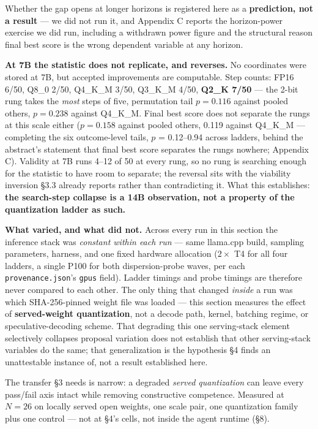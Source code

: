 Whether the gap opens at longer horizons is registered here as a \textbf{prediction, not a result} --- we did not run it, and Appendix C reports the horizon-power exercise we did run, including a withdrawn power figure and the structural reason final best score is the wrong dependent variable at any horizon.

\textbf{At 7B the statistic does not replicate, and reverses.} No coordinates were stored at 7B, but accepted improvements are computable. Step counts: FP16 6/50, Q8\_0 2/50, Q4\_K\_M 3/50, Q3\_K\_M 4/50, \textbf{Q2\_K 7/50} --- the 2-bit rung takes the \emph{most} steps of five, permutation tail $p = 0.116$ against pooled others, $p = 0.238$ against Q4\_K\_M. Final best score does not separate the rungs at this scale either ($p = 0.158$ against pooled others, 0.119 against Q4\_K\_M --- completing the six outcome-level tails, $p$ = 0.12--0.94 across ladders, behind the abstract's statement that final best score separates the rungs nowhere; Appendix C). Validity at 7B runs 4--12 of 50 at every rung, so no rung is searching enough for the statistic to have room to separate; the reversal sits with the viability inversion \S3.3 already reports rather than contradicting it. What this establishes: \textbf{the search-step collapse is a 14B observation, not a property of the quantization ladder as such.}

\textbf{What varied, and what did not.} Across every run in this section the inference stack was \emph{constant within each run} --- same llama.cpp build, sampling parameters, harness, and one fixed hardware allocation ($2 \times$ T4 for all four ladders, a single P100 for both dispersion-probe waves, per each \texttt{provenance.json}'s \texttt{gpus} field). Ladder timings and probe timings are therefore never compared to each other. The only thing that changed \emph{inside} a run was which SHA-256-pinned weight file was loaded --- this section measures the effect of \textbf{served-weight quantization}, not a decode path, kernel, batching regime, or speculative-decoding scheme. That degrading this one serving-stack element selectively collapses proposal variation does not establish that other serving-stack variables do the same; that generalization is the hypothesis \S4 finds an unattestable instance of, not a result established here.

The transfer \S3 needs is narrow: a degraded \emph{served quantization} can leave every pass/fail axis intact while removing constructive competence. Measured at $N = 26$ on locally served open weights, one scale pair, one quantization family plus one control --- not at \S4's cells, not inside the agent runtime (\S8).
